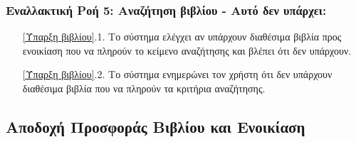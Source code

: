 \documentclass[12pt,a4paper]{article}
\begin{document}
\subsubsection*{Εναλλακτική Ροή 5: Αναζήτηση βιβλίου - Αυτό δεν υπάρχει:}
\begin{enumerate}
    \item[\ref{Ύπαρξη βιβλίου}.1.] Το σύστημα ελέγχει αν υπάρχουν διαθέσιμα βιβλία προς ενοικίαση που να πληρούν το κείμενο αναζήτησης και βλέπει ότι δεν υπάρχουν.
    \item[\ref{Ύπαρξη βιβλίου}.2.] Το σύστημα ενημερώνει τον χρήστη ότι δεν υπάρχουν διαθέσιμα βιβλία που να πληρούν τα κριτήρια αναζήτησης. 
\end{enumerate}

\subsection{Αποδοχή Προσφοράς Βιβλίου και Ενοικίαση}
\label{Rental Use Case}
\end{document}
